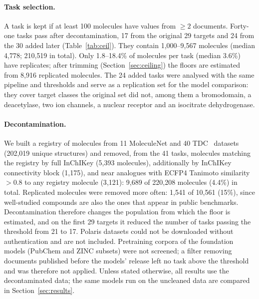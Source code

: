 \paragraph{Task selection.}
A task is kept if at least 100 molecules have values from $\ge2$ documents. Forty-one tasks pass after decontamination, 17 from the original 29 targets and 24 from the 30 added later (Table~\ref{tab:ceil}). They contain 1{,}000--9{,}567 molecules (median 4{,}778; 210{,}519 in total). Only 1.8--18.4\% of molecules per task (median 3.6\%) have replicates; after trimming (Section~\ref{sec:ceiling}) the floors are estimated from 8{,}916 replicated molecules. The 24 added tasks were analysed with the same pipeline and thresholds and serve as a replication set for the model comparison: they cover target classes the original set did not, among them a bromodomain, a deacetylase, two ion channels, a nuclear receptor and an isocitrate dehydrogenase.

\paragraph{Decontamination.}
We built a registry of molecules from 11 MoleculeNet and 40 TDC~\cite{huang2021tdc} datasets (202{,}019 unique structures) and removed, from the 41 tasks, molecules matching the registry by full InChIKey (5{,}393 molecules), additionally by InChIKey connectivity block (1{,}175), and near analogues with ECFP4 Tanimoto similarity $>0.8$ to any registry molecule (3{,}121): 9{,}689 of 220{,}208 molecules (4.4\%) in total. Replicated molecules were removed more often: 1{,}541 of 10{,}561 (15\%), since well-studied compounds are also the ones that appear in public benchmarks. Decontamination therefore changes the population from which the floor is estimated, and on the first 29 targets it reduced the number of tasks passing the threshold from 21 to 17. Polaris datasets could not be downloaded without authentication and are not included. Pretraining corpora of the foundation models (PubChem and ZINC subsets) were not screened; a filter removing documents published before the models' release left no task above the threshold and was therefore not applied. Unless stated otherwise, all results use the decontaminated data; the same models run on the uncleaned data are compared in Section~\ref{sec:results}.

